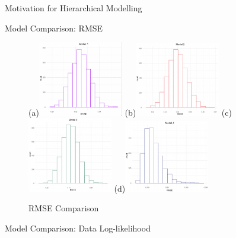 \documentclass{beamer}
\begin{document}
\begin{frame}{Motivation for Hierarchical Modelling}
\begin{frame}{Model Comparison: RMSE}
\begin{figure}[h!]
        \subfigure(a){\includegraphics[width=0.33\textwidth]{plots/model1_rmse.png}} 
        \subfigure(b){\includegraphics[width=0.33\textwidth]{plots/model2_rmse.png}} 
        \subfigure(c){\includegraphics[width=0.33\textwidth]{plots/model3_rmse.png}}
        \subfigure(d){\includegraphics[width=0.33\textwidth]{plots/model4_rmse.png}}
       
      
        \caption{RMSE Comparison}
      
    
      \end{figure}   
\end{frame}

\begin{frame}{Model Comparison: Data Log-likelihood}
    \begin{figure}[h!]
        \centering
        

\end{figure}
\end{frame}
\end{frame}
\end{document}
